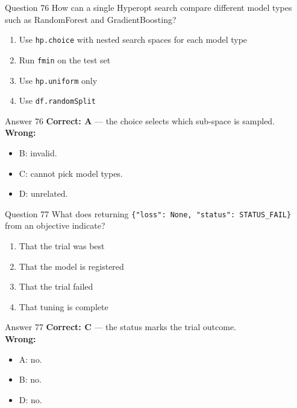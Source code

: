 \documentclass[aspectratio=169,11pt]{beamer}
\begin{document}
\begin{frame}{Question 76}
How can a single Hyperopt search compare different model types such as RandomForest and GradientBoosting?
\begin{enumerate}[label=\Alph*.]
\item Use \texttt{hp.choice} with nested search spaces for each model type
\item Run \texttt{fmin} on the test set
\item Use \texttt{hp.uniform} only
\item Use \texttt{df.randomSplit}
\end{enumerate}
\end{frame}
\begin{frame}{Answer 76}
\textbf{Correct: A} --- the choice selects which sub-space is sampled.\\
\vspace{0.5em}
\textbf{Wrong:}
\begin{itemize}
\item B: invalid.
\item C: cannot pick model types.
\item D: unrelated.
\end{itemize}
\end{frame}

\begin{frame}{Question 77}
What does returning \texttt{\{"loss": None, "status": STATUS\_FAIL\}} from an objective indicate?
\begin{enumerate}[label=\Alph*.]
\item That the trial was best
\item That the model is registered
\item That the trial failed
\item That tuning is complete
\end{enumerate}
\end{frame}
\begin{frame}{Answer 77}
\textbf{Correct: C} --- the status marks the trial outcome.\\
\vspace{0.5em}
\textbf{Wrong:}
\begin{itemize}
\item A: no.
\item B: no.
\item D: no.
\end{itemize}
\end{frame}
\end{document}
